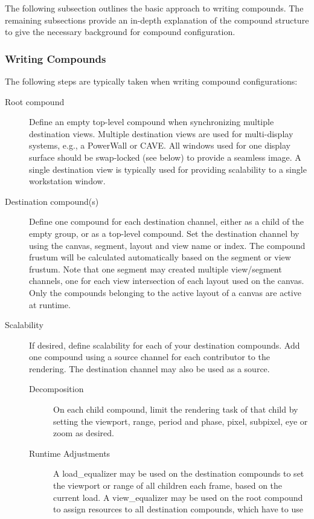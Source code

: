 \documentclass[10pt,a4]{scrartcl}
\begin{document}
The following subsection outlines the basic approach to writing
compounds. The remaining subsections provide an in-depth explanation of
the compound structure to give the necessary background for compound
configuration.

\subsubsection{Writing Compounds}
The following steps are typically taken when writing compound
configurations:
\begin{description}
\item [Root compound] Define an empty top-level compound when
  synchronizing multiple destination views. Multiple destination views
  are used for multi-display systems, e.g., a PowerWall or CAVE. All
  windows used for one display surface should be swap-locked (see below)
  to provide a seamless image. A single destination view is typically
  used for providing scalability to a single workstation window.
\item [Destination compound(s)] Define one compound for each destination
  channel, either as a child of the empty group, or as a top-level compound. Set
  the destination channel by using the canvas, segment, layout and view name or
  index. The compound frustum will be calculated automatically based on the
  segment or view frustum. Note that one segment may created multiple
  view/segment channels, one for each view intersection of each layout used on
  the canvas. Only the compounds belonging to the active layout of a canvas are
  active at runtime.
\item[Scalability] If desired, define scalability for each of your
  destination compounds. Add one compound using a source channel for
  each contributor to the rendering. The destination channel may also be
  used as a source. 
  \begin{description}
  \item[Decomposition] On each child compound, limit the rendering task of that
    child by setting the \textsf{viewport}, \textsf{range}, \textsf{period} and
    \textsf{phase}, \textsf{pixel}, \textsf{subpixel}, \textsf{eye} or
    \textsf{zoom} as desired.
  \item[Runtime Adjustments] A \textsf{load\_equalizer} may be used on
    the destination compounds to set the \textsf{viewport} or
    \textsf{range} of all children each frame, based on the current
    load. A \textsf{view\_equalizer} may be used on the root compound to
    assign resources to all destination compounds, which have to use

\end{description}
\end{description}
\end{document}
